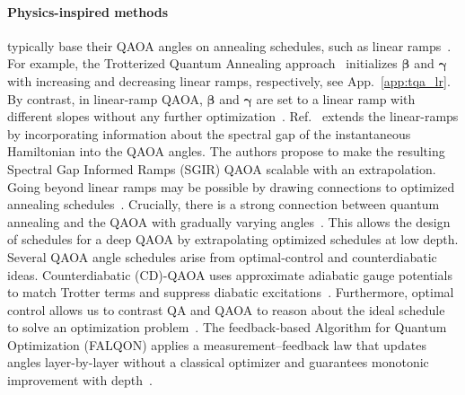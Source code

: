 \documentclass[twocolumn,
english,
aps,
pra,
10pt,
longbibliography,
superscriptaddress,
amsmath,
amssymb,
floatfix
]{revtex4-2}
\begin{document}
\paragraph{Physics-inspired methods} typically base their QAOA angles on annealing schedules, such as linear ramps~\cite{sack2021quantum, Willsch2022, Montanezbarrera2024, Sakai2025}.
For example, the Trotterized Quantum Annealing approach~\cite{sack2021quantum} initializes $\boldsymbol{\beta}$ and $\boldsymbol{\gamma}$ with increasing and decreasing linear ramps, respectively, see App.~\ref{app:tqa_lr}.
By contrast, in linear-ramp QAOA, $\boldsymbol{\beta}$ and $\boldsymbol{\gamma}$ are set to a linear ramp with different slopes without any further optimization~\cite{Montanezbarrera2024}.
Ref.~\cite{Mcdowall2026} extends the linear-ramps by incorporating information about the spectral gap of the instantaneous Hamiltonian into the QAOA angles.
The authors propose to make the resulting Spectral Gap Informed Ramps (SGIR) QAOA scalable with an extrapolation.
Going beyond linear ramps may be possible by drawing connections to optimized annealing schedules~\cite{Das2005, Mukherjee2015}.
Crucially, there is a strong connection between quantum annealing and the QAOA with gradually varying angles~\cite{boulebnane2025}.
This allows the design of schedules for a deep QAOA by extrapolating optimized schedules at low depth. 
Several QAOA angle schedules arise from optimal-control and counterdiabatic ideas. 
Counterdiabatic (CD)-QAOA uses approximate adiabatic gauge potentials to match Trotter terms and suppress diabatic excitations~\cite{WurtzLove2022CDQAOA}.
Furthermore, optimal control allows us to contrast QA and QAOA to reason about the ideal schedule to solve an optimization problem~\cite{bapat2018bang,Brady2021BangAnnealBang,Venuti2021PontryaginOpen}.
The feedback-based Algorithm for Quantum Optimization (FALQON) applies a measurement–feedback law that updates angles layer-by-layer without a classical optimizer and guarantees monotonic improvement with depth~\cite{Magann2022FALQON, Li2024FALQONSim, Rahman2024FALQONQCBO}.
\end{document}
